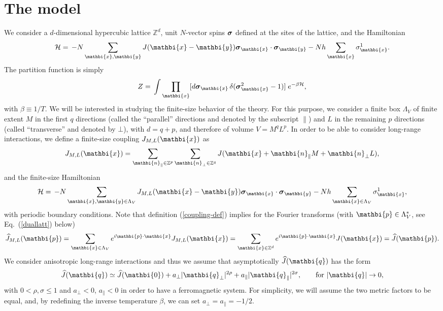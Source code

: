 \documentclass[a4paper,12pt]{article}
\def\bsigma{\mbox{\protect\boldmath $\sigma$}}
\newcommand{\pos}[1]{\mathbi{#1}}
\begin{document}
\section{The model} \label{sec2}

We consider a $d$-dimensional hypercubic lattice $\mathbb{Z}^d$, 
unit $N$-vector spins $\bsigma$ defined at the sites of the lattice,
and the Hamiltonian
\begin{equation}
{\cal H} =\, - N \sum_{\pos{x},\pos{y}} J(\pos{x}-\pos{y}) 
\bsigma_\pos{x} \cdot \bsigma_\pos{y}  -
                N h \sum_{\pos{x}} \sigma_\pos{x}^1.
\label{eq2.1}
\end{equation}
The partition function is simply
\begin{equation}
Z =\, \int \prod_\pos{x} [d\bsigma_\pos{x} \, 
\delta(\bsigma_\pos{x}^2-1)] \; e^{-\beta{\cal H}},
\end{equation}
with $\beta \equiv 1/T$.
We will be interested in studying the finite-size behavior of the theory.
For this purpose, we consider a finite box $\Lambda_V$
of finite extent $M$ in the first $q$ directions (called the 
``parallel''
directions and denoted by the subscript $\|$) and $L$ in the remaining $p$
directions (called ``transverse'' and denoted by $\bot$), with $d=q+p$,
and therefore of volume $V=M^q L^p$. In order to be able to consider 
long-range interactions, we define a finite-size coupling
$J_{M,L}(\pos{x})$ as 
\begin{equation}
J_{M,L}(\pos{x}) = 
   \sum_{\pos{n}_\|\in \mathbb{Z}^p} \sum_{\pos{n}_\bot\in \mathbb{Z}^q}
    J(\pos{x} + \pos{n}_\| M + \pos{n}_\bot L),
\label{coupling-def}
\end{equation}
and the finite-size Hamiltonian
\begin{equation}
{\cal H} =\, - N \sum_{\pos{x},\pos{y}\in \Lambda_V} J_{M,L}(\pos{x}-\pos{y}) 
\bsigma_\pos{x} \cdot \bsigma_\pos{y}  -
                N h \sum_{\pos{x}\in \Lambda_V} \sigma_\pos{x}^1,
\label{eq2.1a}
\end{equation}
with periodic boundary conditions. Note that definition 
(\ref{coupling-def}) implies for the Fourier transforms
(with $\pos{p}\in\Lambda_V^*$, see Eq.~(\ref{duallatt}) below)
\begin{equation}
\widehat{J}_{M,L}(\pos{p}) = 
     \sum_{\pos{x}\in \Lambda_V} e^{i\pos{p}\cdot\pos{x}} J_{M,L}(\pos{x}) = 
     \sum_{\pos{x}\in \mathbb{Z}^d}  e^{i\pos{p}\cdot\pos{x}} J(\pos{x}) =
     \widehat{J}(\pos{p}).
\end{equation}
We consider anisotropic long-range interactions and thus we assume 
that asymptotically $\widehat{J}(\pos{q})$ has the form
\begin{equation}
\widehat{J}(\pos{q}) \simeq \widehat{J}(\pos{0})+  
a_\bot |\pos{q}_\bot|^{2\rho} +
a_\| |\pos{q}_\||^{2\sigma}, \qquad \text{for $|\pos{q}| \to 0$},
\label{Jq-smallq}
\end{equation}
with $0 < \rho,\sigma \le 1$ and 
$a_\bot < 0$, $a_\| < 0$ in order to have a ferromagnetic system. 
For simplicity, we will assume the two metric
factors to be equal, and, by redefining the inverse temperature $\beta$,
we can set $a_\bot = a_\| = -1/2$. 
\end{document}
